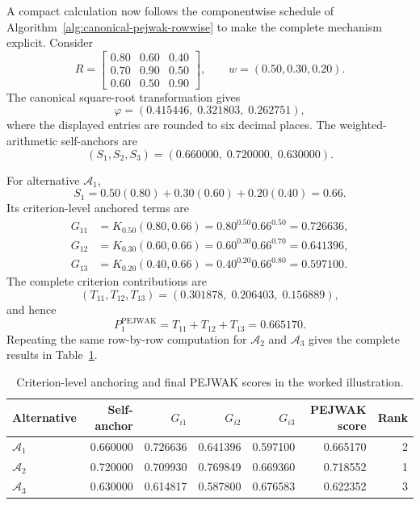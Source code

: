 \documentclass[reqno,11pt]{amsart}
\theoremstyle{definition}
\theoremstyle{plain}
\theoremstyle{remark}
\begin{document}
A compact calculation now follows the componentwise schedule of
Algorithm~\ref{alg:canonical-pejwak-rowwise} to make the complete mechanism
explicit. Consider
\begin{equation*}
R=
\begin{bmatrix}
0.80&0.60&0.40\\
0.70&0.90&0.50\\
0.60&0.50&0.90
\end{bmatrix},
\qquad
w=(0.50,0.30,0.20).
\end{equation*}
The canonical square-root transformation gives
\begin{equation*}
\varphi
=
(0.415446,\;0.321803,\;0.262751),
\end{equation*}
where the displayed entries are rounded to six decimal places. The
weighted-arithmetic self-anchors are
\begin{equation*}
(S_1,S_2,S_3)
=
(0.660000,\;0.720000,\;0.630000).
\end{equation*}

For alternative \(\mathcal A_1\),
\[
S_1
=
0.50(0.80)+0.30(0.60)+0.20(0.40)
=
0.66.
\]
Its criterion-level anchored terms are
\begin{align*}
G_{11}
&=
K_{0.50}(0.80,0.66)
=
0.80^{0.50}0.66^{0.50}
=
0.726636,
\\
G_{12}
&=
K_{0.30}(0.60,0.66)
=
0.60^{0.30}0.66^{0.70}
=
0.641396,
\\
G_{13}
&=
K_{0.20}(0.40,0.66)
=
0.40^{0.20}0.66^{0.80}
=
0.597100.
\end{align*}
The complete criterion contributions are
\[
(T_{11},T_{12},T_{13})
=
(0.301878,\;0.206403,\;0.156889),
\]
and hence
\[
P_1^{\mathrm{PEJWAK}}
=
T_{11}+T_{12}+T_{13}
=
0.665170.
\]
Repeating the same row-by-row computation for \(\mathcal A_2\) and
\(\mathcal A_3\) gives the complete results in
Table~\ref{tab:worked-pejwak-example}.

\begin{table}[htbp]
\caption{Criterion-level anchoring and final PEJWAK scores in the worked
illustration.}
\label{tab:worked-pejwak-example}
\centering
\small
\begin{tabular}{@{}lrrrrrr@{}}
\toprule
Alternative
&
Self-anchor
&
\(G_{i1}\)
&
\(G_{i2}\)
&
\(G_{i3}\)
&
PEJWAK score
&
Rank
\\
\midrule
\(\mathcal A_1\)
&
0.660000
&
0.726636
&
0.641396
&
0.597100
&
0.665170
&
2
\\
\(\mathcal A_2\)
&
0.720000
&
0.709930
&
0.769849
&
0.669360
&
0.718552
&
1
\\
\(\mathcal A_3\)
&
0.630000
&
0.614817
&
0.587800
&
0.676583
&
0.622352
&
3
\\
\bottomrule
\end{tabular}
\end{table}
\end{document}
